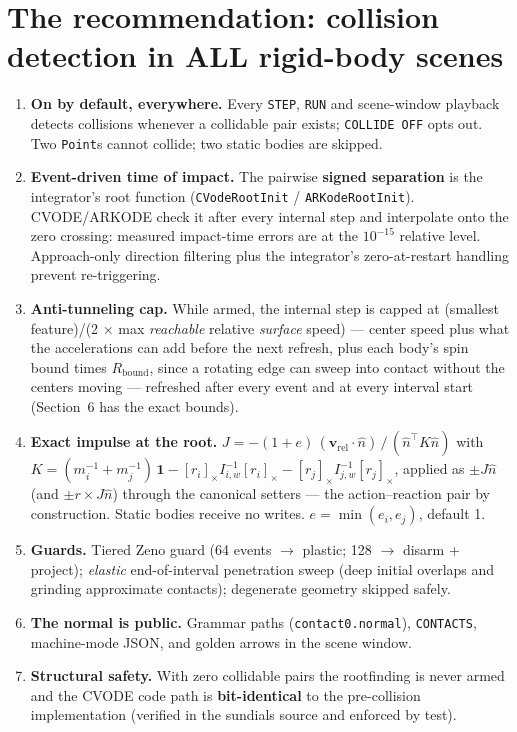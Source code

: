 \documentclass[11pt]{article}
\newcommand{\kw}[1]{\texttt{\uppercase{#1}}}
\newcommand{\code}[1]{\texttt{#1}}
\begin{document}
\section{The recommendation: collision detection in ALL rigid-body scenes}

\begin{enumerate}
\item \textbf{On by default, everywhere.} Every \kw{step}, \kw{run} and
      scene-window playback detects collisions whenever a collidable pair
      exists; \kw{collide off} opts out. Two \code{Point}s cannot collide; two
      static bodies are skipped.
\item \textbf{Event-driven time of impact.} The pairwise \textbf{signed
      separation} is the integrator's root function (\code{CVodeRootInit} /
      \code{ARKodeRootInit}). CVODE/ARKODE check it after every internal step
      and interpolate onto the zero crossing: measured impact-time errors are
      at the $10^{-15}$ relative level. Approach-only direction filtering plus
      the integrator's zero-at-restart handling prevent re-triggering.
\item \textbf{Anti-tunneling cap.} While armed, the internal step is capped
      at (smallest feature)/(2 $\times$ max \emph{reachable} relative
      \emph{surface} speed) --- center speed plus what the accelerations
      can add before the next refresh, plus each body's spin bound times
      $R_{\mathrm{bound}}$, since a rotating edge can sweep into contact
      without the centers moving --- refreshed after every event and at
      every interval start (Section~6 has the exact bounds).
\item \textbf{Exact impulse at the root.}
      $J = -(1+e)\,(\mathbf v_{\mathrm{rel}}\!\cdot\!\hat n)\,/\,
      (\hat n^{\!\top} K \hat n)$ with
      $K = (m_i^{-1}\!+m_j^{-1})\,\mathbf 1
      - [r_i]_\times I^{-1}_{i,w} [r_i]_\times
      - [r_j]_\times I^{-1}_{j,w} [r_j]_\times$,
      applied as $\pm J\hat n$ (and $\pm r \times J\hat n$) through the
      canonical setters --- the action--reaction pair by construction. Static
      bodies receive no writes. $e = \min(e_i, e_j)$, default 1.
\item \textbf{Guards.} Tiered Zeno guard (64 events $\to$ plastic; 128 $\to$
      disarm + project); \emph{elastic} end-of-interval penetration sweep
      (deep initial overlaps and grinding approximate contacts); degenerate
      geometry skipped safely.
\item \textbf{The normal is public.} Grammar paths (\code{contact0.normal}),
      \kw{contacts}, machine-mode JSON, and golden arrows in the scene window.
\item \textbf{Structural safety.} With zero collidable pairs the rootfinding is
      never armed and the CVODE code path is \textbf{bit-identical} to the
      pre-collision implementation (verified in the sundials source and
      enforced by test).
\end{enumerate}
\end{document}

